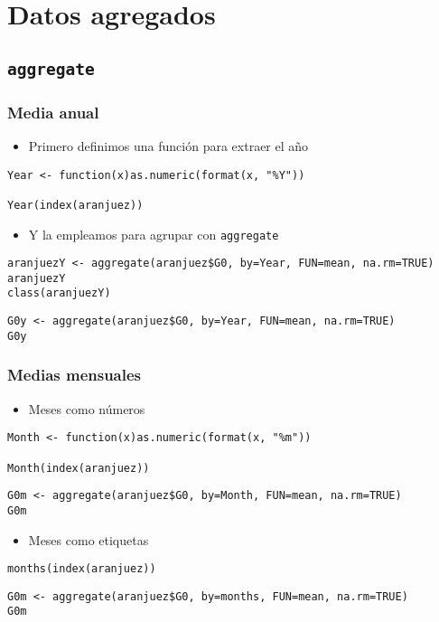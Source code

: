 \documentclass[bigger]{beamer}
\begin{document}
\section{Datos agregados}
\label{sec-2}
\subsection{\texttt{aggregate}}
\label{sec-2-1}
\begin{frame}[fragile]
\frametitle{Media anual}
\label{sec-2-1-1}

\begin{itemize}
\item Primero definimos una función para extraer el año
\end{itemize}

\lstset{language=R}
\begin{lstlisting}
Year <- function(x)as.numeric(format(x, "%Y"))

Year(index(aranjuez))
\end{lstlisting}
\begin{itemize}
\item Y la empleamos para agrupar con \texttt{aggregate}
\end{itemize}

\lstset{language=R}
\begin{lstlisting}
aranjuezY <- aggregate(aranjuez$G0, by=Year, FUN=mean, na.rm=TRUE)
aranjuezY
class(aranjuezY)
\end{lstlisting}


\lstset{language=R}
\begin{lstlisting}
G0y <- aggregate(aranjuez$G0, by=Year, FUN=mean, na.rm=TRUE)
G0y
\end{lstlisting}
\end{frame}
\begin{frame}[fragile]
\frametitle{Medias mensuales}
\label{sec-2-1-2}

\begin{itemize}
\item Meses como números
\end{itemize}

\lstset{language=R}
\begin{lstlisting}
Month <- function(x)as.numeric(format(x, "%m"))

Month(index(aranjuez))
\end{lstlisting}


\lstset{language=R}
\begin{lstlisting}
G0m <- aggregate(aranjuez$G0, by=Month, FUN=mean, na.rm=TRUE)
G0m
\end{lstlisting}

\begin{itemize}
\item Meses como etiquetas
\end{itemize}

\lstset{language=R}
\begin{lstlisting}
months(index(aranjuez))
\end{lstlisting}


\lstset{language=R}
\begin{lstlisting}
G0m <- aggregate(aranjuez$G0, by=months, FUN=mean, na.rm=TRUE)
G0m
\end{lstlisting}
\end{frame}
\end{document}
